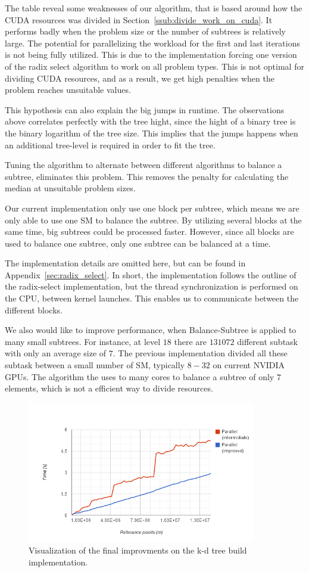 The table reveal some weaknesses of our algorithm, that is based around how the CUDA resources was divided in Section~\ref{ssub:divide_work_on_cuda}. It performs badly when the problem size or the number of subtrees is relatively large. The potential for parallelizing the workload for the first and last iterations is not being fully utilized. This is due to the implementation forcing one version of the radix select algorithm to work on all problem types. This is not optimal for dividing CUDA resources, and as a result, we get high penalties when the problem reaches unsuitable values.

This hypothesis can also explain the big jumps in runtime. The observations above correlates perfectly with the tree hight, since the hight of a binary tree is the binary logarithm of the tree size. This implies that the jumps happens when an additional tree-level is required in order to fit the tree.

Tuning the algorithm to alternate between different algorithms to balance a subtree, eliminates this problem. This removes the penalty for calculating the median at unsuitable problem sizes.

Our current implementation only use one block per subtree, which means we are only able to use one SM to balance the subtree. By utilizing several blocks at the same time, big subtrees could be processed faster. However, since all blocks are used to balance one subtree, only one subtree can be balanced at a time.

The implementation details are omitted here, but can be found in Appendix~\ref{sec:radix_select}. In short, the implementation follows the outline of the radix-select implementation, but the thread synchronization is performed on the CPU, between kernel launches. This enables us to communicate between the different blocks.

We also would like to improve performance, when Balance-Subtree is applied to many small subtrees. For instance, at level $18$ there are $131072$ different subtask with only an average size of $7$. The previous implementation divided all these subtask between a small number of SM, typically $8-32$ on current NVIDIA GPUs\@. The algorithm the uses to many cores to balance a subtree of only $7$ elements, which is not a efficient way to divide resources.

\begin{figure}[ht!]
\centering
\includegraphics[width=100mm]{../gfx/the_jumps_final.png}
\caption{Visualization of the final improvments on the k-d tree build implementation.}
\label{fig:the_jumps_final}
\end{figure}

